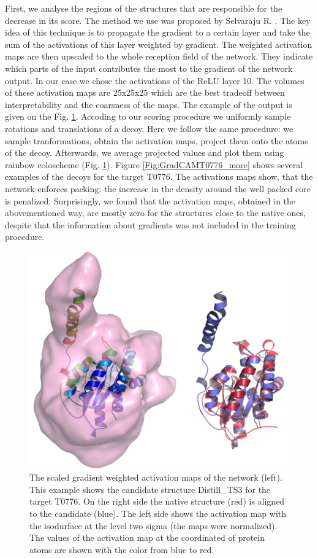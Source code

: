 \documentclass[letter,10pt]{article}
\begin{document}
First, we analyse the regions of the structures that are responsible for the decrease in its score. The method we use was proposed 
by Selvaraju R. \cite{selvaraju2016grad}. The key idea of this technique is to propagate the gradient to a certain layer and take the sum of the 
activations of this layer weighted by gradient. The weighted activation maps are then upscaled to the whole reception field of the network.
They indicate which parts of the input contributes the most to the gradient of the network output. In our case we chose the activations 
of the ReLU layer 10. The volumes of these activation maps are 25x25x25 which are the best tradeoff between interpretability and the coarsness 
of the maps. The example of the output is given on the Fig. \ref{Fig:GradCAMT0776}. Accoding to our scoring procedure we uniformly sample rotations 
and translations of a decoy. Here we follow the same procedure: we sample tranformations, obtain the activation maps, project them onto 
the atoms of the decoy. Afterwards, we average projected values and plot them using rainbow coloscheme (Fig. \ref{Fig:GradCAMT0776}). 
Figure \ref{Fig:GradCAMT0776_more} shows several examples of the decoys for the target T0776. 
The activations maps show, that the network enforces packing: the increase in the density 
around the well packed core is penalized. Surprisingly, we found that the activation maps, obtained in the abovementioned way, 
are mostly zero for the structures close to the native ones, despite that the information about gradients was not included in 
the training procedure. 

\begin{figure}[H]
    \centering
    \includegraphics[width=\linewidth]{Fig/FigT0776.png}
    \caption{The scaled gradient weighted activation maps of the network (left). 
    This example shows the candidate structure Distill\_TS3 for 
    the target T0776. On the right side the native structure (red) is aligned to the candidate (blue). The left side shows the activation 
    map with the isodurface at the level two sigma (the maps were normalized). The values of the activation map at the coordinated of protein
    atoms are shown with the color from blue to red.}
    \label{Fig:GradCAMT0776}
\end{figure}
\end{document}
